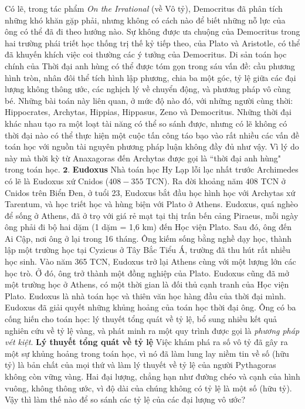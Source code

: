 \begin{multicols}{2}
	\vskip 0.1cm
	Có lẽ, trong tác phẩm \textit{On the Irrational} (về Vô tỷ), Democritus đã phân tích những khó khăn gặp phải, nhưng không có cách nào để biết những nỗ lực của ông có thể đã đi theo hướng nào.
	\vskip 0.1cm
	Sự không được ưa chuộng của Democritus trong hai trường phái triết học thống trị thế kỷ tiếp theo, của Plato và Aristotle, có thể đã khuyến khích việc coi thường các ý tưởng của Democritus. 
	\vskip 0.1cm
	Di sản toán học chính của Thời đại anh hùng có thể được tóm gọn trong sáu vấn đề: cầu phương hình tròn, nhân đôi thể tích hình lập phương, chia ba một góc, tỷ lệ giữa các đại lượng không thông ước, các nghịch lý về chuyển động, và phương pháp vô cùng bé. 
	\vskip 0.1cm
	Những bài toán này liên quan, ở mức độ nào đó, với những người cùng thời: Hippocrates, Archytas, Hippias, Hippasus, Zeno và Democritus. 
	\vskip 0.1cm
	Những thời đại khác nhau tạo ra một loạt tài năng có thể so sánh được, nhưng có lẽ không có thời đại nào có thể thực hiện một cuộc tấn công táo bạo vào rất nhiều các vấn đề toán học với nguồn tài nguyên phương pháp luận không đầy đủ như vậy. Vì lý do này mà thời kỳ từ Anaxagoras đến Archytas được gọi là ``thời đại anh hùng" trong toán học.
	\vskip 0.1cm
	$\pmb{2.}$ \textbf{\color{lichsutoanhoc}Eudoxus}
	\vskip 0.1cm
	 Nhà toán học Hy Lạp lỗi lạc nhất trước Archimedes có lẽ là Eudoxus xứ Cnidos ($408 - 355$ TCN).
	 \vskip 0.1cm
	Ra đời khoảng năm 408 TCN ở Cnidos trên Biển Đen, ở tuổi 23, Eudoxus bắt đầu học hình học với Archytas xứ Tarentum, và học triết học và hùng biện với Plato ở Athens. Eudoxus, quá nghèo để sống ở Athens, đã ở trọ với giá rẻ mạt tại thị trấn bến cảng Piraeus, mỗi ngày ông phải đi bộ hai dặm (1 dặm = 1,6 km) đến Học viện Plato. Sau đó, ông đến Ai Cập, nơi ông ở lại trong 16 tháng. Ông kiếm sống bằng nghề dạy học, thành lập một trường học tại Cyzicus ở Tây Bắc Tiểu Á, trường đã thu hút rất nhiều học sinh. Vào năm 365 TCN, Eudoxus trở lại Athens cùng với một lượng lớn các học trò. Ở đó, ông trở thành một đồng nghiệp của Plato.
	Eudoxus cũng đã mở một trường học ở Athens, có một thời gian là đối thủ cạnh tranh của Học viện Plato.
	\vskip 0.1cm
	Eudoxus là nhà toán học và thiên văn học hàng đầu của thời đại mình. Eudoxus đã giải quyết những khủng hoảng của toán học thời đại ông. Ông có ba cống hiến cho toán học: lý thuyết tổng quát về tỷ lệ, bổ sung nhiều kết quả nghiên cứu về tỷ lệ vàng, và phát minh ra một quy trình được gọi là \textit{phương pháp vét kiệt}.
	\vskip 0.1cm 
	\textbf{\color{lichsutoanhoc}Lý thuyết tổng quát về tỷ lệ} 
	\vskip 0.1cm
	Việc khám phá ra số vô tỷ đã gây ra một sự khủng hoảng trong toán học, vì nó đã làm lung lay niềm tin về số (hữu tỷ) là bản chất của mọi thứ và làm lý thuyết về tỷ lệ của người Pythagoras không còn vững vàng. Hai đại lượng, chẳng hạn như đường chéo và cạnh của hình vuông, không thông ước, vì độ dài của chúng không có tỷ lệ là một số (hữu tỷ). Vậy thì làm thế nào để so sánh các tỷ lệ của các đại lượng vô ước?

\end{multicols}
